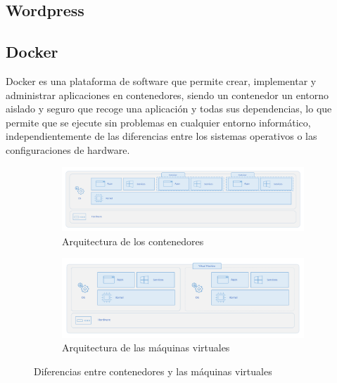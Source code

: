         \subsection{Wordpress}

            
        
        
        \subsection{Docker}
        
            Docker es una plataforma de software que permite crear, implementar y administrar aplicaciones en contenedores, siendo un contenedor un entorno aislado y seguro que recoge una aplicación y todas sus dependencias, lo que permite que se ejecute sin problemas en cualquier entorno informático, independientemente de las diferencias entre los sistemas operativos o las configuraciones de hardware.
            
            \begin{figure}[h]
                \centering
                \begin{subfigure}[h]{\textwidth}
                    \includegraphics[width=\textwidth]{images/Diagramas/Esquema de Contenedores.png}
                    \caption{Arquitectura de los contenedores}
                    \label{fig:arquitectura-contenedores}
                \end{subfigure}
                
                \begin{subfigure}[h]{\textwidth}
                    \includegraphics[width=\textwidth]{images/Diagramas/Esquema de MVs.png}
                    \caption{Arquitectura de las máquinas virtuales}
                    \label{fig:arquitectura-maquinasvirtuales}
                \end{subfigure}
                \caption{Diferencias entre contenedores y las máquinas virtuales}
                \label{fig:contenedores-vs-maquinasvirtuales}
            \end{figure}
            
